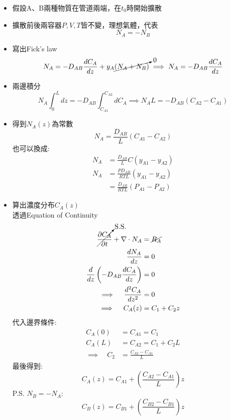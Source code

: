 \documentclass[../main.tex]{subfiles}
\begin{document}
\begin{itemize}
  \item 假設A、B兩種物質在管道兩端，在$t_0$時開始擴散
  \item 擴散前後兩容器$P,V,T$皆不變，理想氣體，代表
  \begin{equation}
    N_A = -N_B
  \end{equation}
  \item 寫出Fick's law
  \begin{equation}
    N_A = -D_{AB}\frac{dC_A}{dz} + y_A \cancelto{0}{(N_A+N_B)} \implies N_A = -D_{AB}\frac{dC_A}{dz}
  \end{equation}
  \item 兩邊積分
  \begin{equation}
    N_A\int_0^L dz = -D_{AB}\int_{C_{A1}}^{C_{A2}} dC_A \implies N_A L = -D_{AB}\left(C_{A2}-C_{A1}\right)
  \end{equation}
  \item 得到$N_A(z)$為常數
  \begin{equation}
    N_A = \frac{D_{AB}}{L}\left(C_{A1}-C_{A2}\right)
  \end{equation}
  也可以換成:
  \begin{align}
    N_A &= \frac{D_{AB}}{L} C\left(
      y_{A1}-y_{A2}
    \right) \nonumber\\
    N_A &= \frac{P D_{AB}}{R T L} \left(
      y_{A1}-y_{A2}
    \right) \nonumber\\
    &= \frac{D_{AB}}{RTL}\left(
      P_{A1}-P_{A2}
    \right)
  \end{align}
  \item 算出濃度分布$C_A(z)$\\
  透過Equation of Continuity
  \begin{align}
    \cancelto{\text{S.S.}}{\frac{\partial C_A}{\partial t}} + \nabla\cdot N_A &= \cancel{R_A}\nonumber\\
    \frac{dN_A}{dz} &= 0 \nonumber\\
    \frac{d}{dz}\left(-
      D_{AB}\frac{dC_A}{dz}
    \right) &= 0 \nonumber\\
    \implies \quad \frac{d^2 C_A}{dz^2} &= 0\nonumber\\
    \implies \quad C_A(z) &= C_1 + C_2 z
  \end{align}
  代入邊界條件:
  \begin{align}
    C_A(0) &= C_{A1} = C_1 \nonumber\\
    C_A(L) &= C_{A2} = C_1 + C_2 L \nonumber\\
    \implies \quad C_2 &= \frac{C_{A2}-C_{A1}}{L}
  \end{align}
  最後得到:
  \begin{equation}
    \boxed{C_A(z) = C_{A1} + \left(
      \frac{C_{A2}-C_{A1}}{L}
    \right) z}
  \end{equation}
  P.S. $N_B=-N_A$:
  \begin{equation}
    C_B(z) = C_{B1} + \left(
      \frac{C_{B2}-C_{B1}}{L}
    \right) z
  \end{equation}
 \end{itemize}
\end{document}
